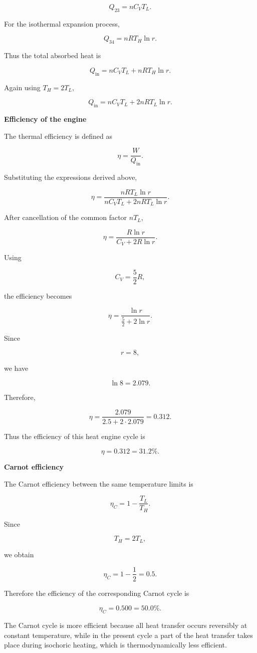 \documentclass[letterpaper,12pt]{letter}
\begin{document}
\begin{enumerate}[label=\Roman*.]
\begin{enumerate}[label=\arabic*.]
$$Q_{23}=nC_VT_L.$$

For the isothermal expansion process,

$$Q_{34}=nRT_H\ln r.$$

Thus the total absorbed heat is

$$Q_{\mathrm{in}}=nC_VT_L+nRT_H\ln r.$$

Again using $T_H=2T_L$,

$$Q_{\mathrm{in}}=nC_VT_L+2nRT_L\ln r.$$

\bigskip

\textbf{Efficiency of the engine}

The thermal efficiency is defined as

$$\eta=\frac{W}{Q_{\mathrm{in}}}.$$

Substituting the expressions derived above,

$$\eta=\frac{nRT_L\ln r}{nC_VT_L+2nRT_L\ln r}.$$

After cancellation of the common factor $nT_L$,

$$\eta=\frac{R\ln r}{C_V+2R\ln r}.$$

Using

$$C_V=\frac{5}{2}R,$$

the efficiency becomes

$$\eta=\frac{\ln r}{\frac{5}{2}+2\ln r}.$$

Since

$$r=8,$$

we have

$$\ln8=2.079.$$

Therefore,

$$\eta=\frac{2.079}{2.5+2\cdot2.079}=0.312.$$

Thus the efficiency of this heat engine cycle is

$$\boxed{\eta=0.312=31.2\%}.$$

\bigskip

\textbf{Carnot efficiency}

The Carnot efficiency between the same temperature limits is

$$\eta_C=1-\frac{T_L}{T_H}.$$

Since

$$T_H=2T_L,$$

we obtain

$$\eta_C=1-\frac{1}{2}=0.5.$$

Therefore the efficiency of the corresponding Carnot cycle is

$$\boxed{\eta_C=0.500=50.0\%}.$$

The Carnot cycle is more efficient because all heat transfer occurs reversibly at constant temperature, while in the present cycle a part of the heat transfer takes place during isochoric heating, which is thermodynamically less efficient.


\end{enumerate}
\end{enumerate}
\end{document}
